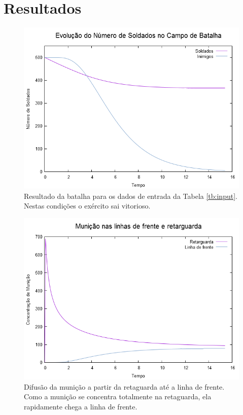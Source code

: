 \documentclass{article}
\begin{document}
\section{Resultados}

\begin{figure}[ht]
	\centering
	\includegraphics[scale=0.4]{figs/battle_reaction.png}
	\caption{Resultado da batalha para os dados de entrada da Tabela \ref{tb:input}. Nestas condições o exército sai vitorioso.}
	\label{fig:battle1}
\end{figure}

\begin{figure}[ht]
	\centering
	\includegraphics[scale=0.4]{figs/battle_ammo_diffusion.png}
	\caption{Difusão da munição a partir da retaguarda até a linha de frente. Como a munição se concentra totalmente na retaguarda, ela rapidamente chega a linha de frente.}
	\label{fig:battle1-ammo}
\end{figure}
\end{document}
